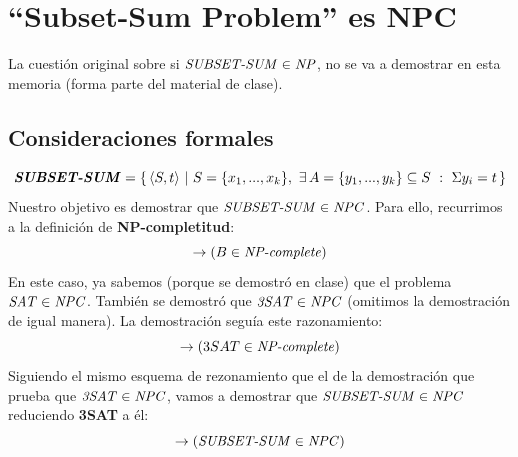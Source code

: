 \documentclass[../main]{subfiles}
\begin{document}
\chapter{``Subset-Sum Problem'' es NPC}

{
\hypersetup{linkcolor=black}
\renewcommand{\contentsname}{Contenidos}
\minitoc %
\vspace{5mm}
}
La cuestión original sobre si \textbf{$\text{\textit{SUBSET-SUM}} \in \text{\textit{NP}}$}, no se va a demostrar en esta memoria (forma parte del material de clase). 
\section{Consideraciones formales}
\begin{equation*}
\text{\textit{\textbf{SUBSET-SUM}}}=\{\, \langle S, t \rangle \ | \ S = \{ x_1, ..., x_k \}, \ \exists \, A= \{y_1,...,y_k\} \subseteq S \ : \ \Sigma y_i = t \, \}
\vspace{2mm}
\end{equation*}
Nuestro objetivo es demostrar que \textbf{$\text{\textit{SUBSET-SUM}} \in \text{\textit{NPC}}$}. Para ello, recurrimos a la definición de \textbf{NP-completitud}:\vspace{2mm}
\begin{equation*}
[(A \in \text{\textit{NP-complete}}) \land (B \in \text{\textit{NP}}) \land (A \leq_p B)] \rightarrow (B \in \text{\textit{NP-complete}})\vspace{2mm}
\end{equation*}
En este caso, ya sabemos (porque se demostró en clase) que el problema \textbf{$\text{\textit{SAT}} \in \text{\textit{NPC}}$}. También se demostró que \textbf{$\text{\textit{3SAT}} \in \text{\textit{NPC}}$ }(omitimos la demostración de igual manera). La demostración seguía este razonamiento:\vspace{3mm}
\begin{equation*}
[(SAT \in \text{\textit{NP-complete}}) \land (3SAT \in \text{\textit{NP}}) \land (SAT \leq_p 3SAT)] \rightarrow (3SAT \in \text{\textit{NP-complete}})\vspace{3mm}
\end{equation*}
Siguiendo el mismo esquema de rezonamiento que el de la demostración que prueba que \textbf{$\text{\textit{3SAT}} \in \text{\textit{NPC}}$}, vamos a demostrar que \textbf{$\text{\textit{SUBSET-SUM}} \in \text{\textit{NPC}}$} reduciendo \textbf{3SAT} a él:\vspace{3mm}
\begin{equation*}
[(3SAT \in \text{\textit{NPC}}) \land (\text{\textit{SUBSET-SUM}} \in \text{\textit{NP}}) \land (3SAT \leq_p \text{\textit{SUBSET-SUM}})] \rightarrow (\text{\textit{SUBSET-SUM}} \in \text{\textit{NPC}})\vspace{0mm}
\end{equation*}
\end{document}
